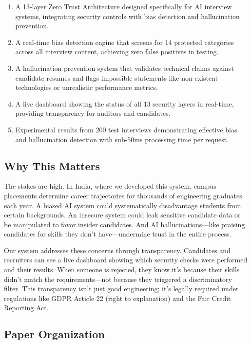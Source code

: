 \documentclass[conference]{IEEEtran}
\begin{document}
\begin{enumerate}
\item A 13-layer Zero Trust Architecture designed specifically for AI interview systems, integrating security controls with bias detection and hallucination prevention.

\item A real-time bias detection engine that screens for 14 protected categories across all interview content, achieving zero false positives in testing.

\item A hallucination prevention system that validates technical claims against candidate resumes and flags impossible statements like non-existent technologies or unrealistic performance metrics.

\item A live dashboard showing the status of all 13 security layers in real-time, providing transparency for auditors and candidates.

\item Experimental results from 200 test interviews demonstrating effective bias and hallucination detection with sub-50ms processing time per request.
\end{enumerate}

\subsection{Why This Matters}

The stakes are high. In India, where we developed this system, campus placements determine career trajectories for thousands of engineering graduates each year. A biased AI system could systematically disadvantage students from certain backgrounds. An insecure system could leak sensitive candidate data or be manipulated to favor insider candidates. And AI hallucinations—like praising candidates for skills they don't have—undermine trust in the entire process.

Our system addresses these concerns through transparency. Candidates and recruiters can see a live dashboard showing which security checks were performed and their results. When someone is rejected, they know it's because their skills didn't match the requirements—not because they triggered a discriminatory filter. This transparency isn't just good engineering; it's legally required under regulations like GDPR Article 22 (right to explanation) and the Fair Credit Reporting Act.

\subsection{Paper Organization}
\end{document}
